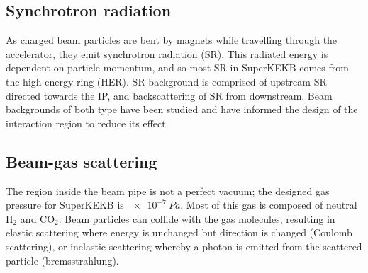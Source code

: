 \documentclass[12pt]{thesis}  %
\begin{document}
\subsection{Synchrotron radiation}

As charged beam particles are bent by magnets while travelling through the accelerator, they emit synchrotron radiation (SR). This radiated energy is dependent on particle momentum, and so most SR in SuperKEKB comes from the high-energy ring (HER). SR background is comprised of upstream SR directed towards the IP, and backscattering of SR from downstream. Beam backgrounds of both type have been studied and have informed the design of the interaction region to reduce its effect.

\subsection{Beam-gas scattering}	

The region inside the beam pipe is not a perfect vacuum; the designed gas pressure for SuperKEKB is $\SI{e-7}{Pa}$. Most of this gas is composed of neutral H$_2$ and CO$_2$. Beam particles can collide with the gas molecules, resulting in elastic scattering where energy is unchanged but direction is changed (Coulomb scattering), or inelastic scattering whereby a photon is emitted from the scattered particle (bremsstrahlung).
\end{document}
